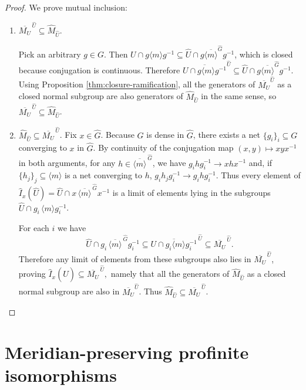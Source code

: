 \documentclass[11pt]{article}
\begin{document}
	\begin{proof}
		We prove mutual inclusion:
		\begin{enumerate}
			\item $\overline{M_U}^{\,\widehat U}\subseteq \widehat M_{\widehat U}$. 
			
			Pick an arbitrary $g\in G$. Then $U\cap g\langle m\rangle g^{-1}\subseteq \widehat{U}\cap g\overline{\langle m\rangle}^{\widehat{G}} g^{-1}$, which is closed because conjugation is continuous. Therefore $\overline{U\cap g\langle m\rangle g^{-1}}^{\widehat{U}}\subseteq \widehat{U}\cap g\overline{\langle m\rangle}^{\widehat{G}} g^{-1}$. Using Proposition \ref{thm:closure-ramification}, all the generators of $\overline{M_U}^{\widehat{U}}$ as a closed normal subgroup are also generators of $\widehat M_{\widehat U}$ in the same sense, so $\overline{M_U}^{\,\widehat U}\subseteq \widehat M_{\widehat U}$.
			
			
			\item $\widehat M_{\widehat U}\subseteq \overline{M_U}^{\,\widehat U}$. Fix $x\in \widehat G$. Because $G$ is dense in $\widehat G$, there exists a net $\{g_i\}_i\subseteq G$ converging to $x$ in $\widehat G$. By continuity of the conjugation map $(x,y)\mapsto xyx^{-1}$ in both arguments, for any $h\in \overline{\langle m\rangle}^{\,\widehat G}$, we have $g_i h g_i^{-1}\to x h x^{-1}$ and, if $\{h_j\}_j\subseteq{\langle m\rangle}$ is a net converging to $h$, $g_ih_jg_i^{-1}\to g_ih g_i^{-1}$. Thus every element of \(\widehat I_x(\widehat U)=\widehat U\cap x\,\overline{\langle m\rangle}^{\,\widehat G}x^{-1}\)
			is a limit of elements lying in the subgroups $\widehat U\cap g_i\,{\langle m\rangle}g_i^{-1}$.
			
			For each $i$ we have
			\[\widehat U\cap g_i\,\overline{\langle m\rangle}^{\,\widehat G}g_i^{-1}\subseteq \overline{U\cap g_i\langle m\rangle g_i^{-1}}^{\,\widehat U}\subseteq \overline{M_U}^{\,\widehat U}.\]
			Therefore any limit of elements from these subgroups also lies in $\overline{M_U}^{\,\widehat U}$, proving
			\({\widehat I_x(\widehat U)\subseteq \overline{M_U}^{\,\widehat U},}\)
			namely that all the generators of $\widehat M_{\widehat U}$ as a closed normal subgroup are also in $\overline{M_U}^{\widehat{U}}$. Thus $\widehat M_{\widehat U}\subseteq \overline{M_U}^{\,\widehat U}$.
		\end{enumerate}
	\end{proof}
	
	\section{Meridian-preserving profinite isomorphisms}
	
\end{document}
